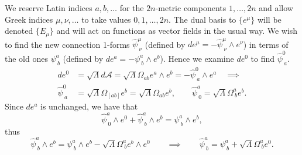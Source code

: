 We reserve Latin indices $a,b,\dots$ for the $2n$-metric components
$1,\dots,2n$ and allow Greek indices $\mu,\nu,\dots$ to take values
$0,1,\dots,2n$. The dual basis to $\{e^{\mu}\}$ will be denoted
$\{E_{\mu}\}$ and will act on functions as vector fields in the usual
way. We wish to find the new connection 1-forms $\hat{\psi}_{\ \nu}^{\mu}$
(defined by $ de^{\mu}=-\hat{\psi}_{\ \nu}^{\mu}\wedge e^{\nu}$)
in terms of the old ones $\psi_{\ b}^{a}$ (defined by $ de^{a}=-\psi_{\ b}^{a}\wedge e^{b}$).
Hence we examine ${d}e^{0}$ to find $\hat{\psi}_{\ a}^{0}.$
\begin{align*}
{d}e^{0}&=\sqrt{\Lambda}{d}\mathcal{A}=\sqrt{\Lambda}\Omega_{ab}e^{a}\wedge e^{b}=-\hat{\psi}_{\ a}^{0}\wedge e^{a}\quad\implies \\
\hat{\psi}_{\ a}^{0}&=\sqrt{\Lambda}\Omega_{[ab]}e^{b}=\sqrt{\Lambda}\Omega_{ab}e^{b},\qquad\hat{\psi}_{\ 0}^{a}=\sqrt{\Lambda}\Omega_{\ b}^{a}e^{b}.
\end{align*}
Since ${d}e^{a}$ is unchanged, we have that
\[
\hat{\psi}_{\ 0}^{a}\wedge e^{0}+\hat{\psi}_{\ b}^{a}\wedge e^{b}=\psi_{\ b}^{a}\wedge e^{b},
\]
thus
\[
\hat{\psi}_{\ b}^{a}\wedge e^{b}=\psi_{\ b}^{a}\wedge e^{b}-\sqrt{\Lambda}\Omega_{\ b}^{a}e^{b}\wedge e^{0}\qquad\implies\qquad\hat{\psi}_{\ b}^{a}=\psi_{\ b}^{a}+\sqrt{\Lambda}\Omega_{\ b}^{a}e^{0}.
\]


